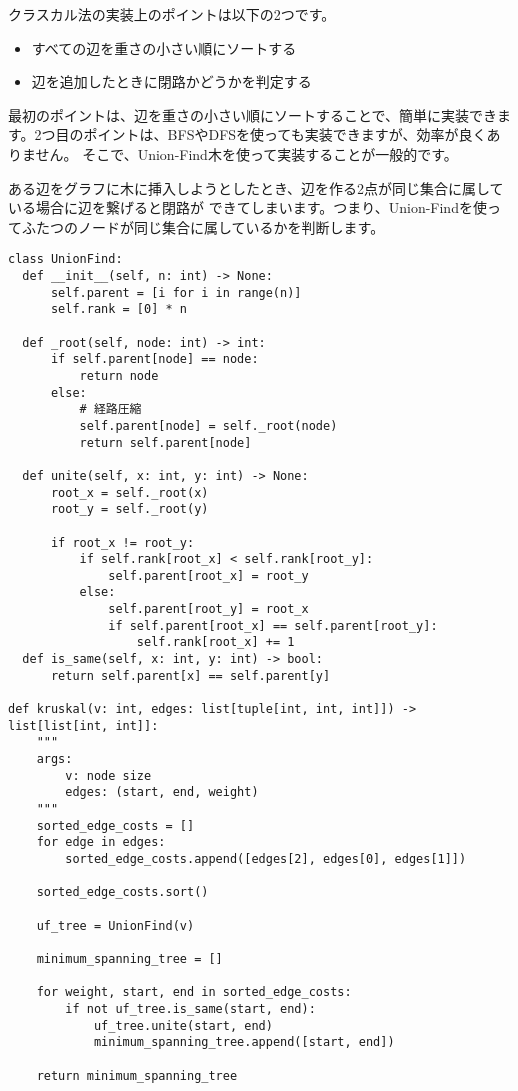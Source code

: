 \documentclass{jlreq}
\begin{document}
\vspace{0.5cm}

クラスカル法の実装上のポイントは以下の2つです。

\begin{itemize}
  \item すべての辺を重さの小さい順にソートする
  \item 辺を追加したときに閉路かどうかを判定する
\end{itemize}

最初のポイントは、辺を重さの小さい順にソートすることで、簡単に実装できます。2つ目のポイントは、BFSやDFSを使っても実装できますが、効率が良くありません。
そこで、Union-Find木を使って実装することが一般的です。

ある辺をグラフに木に挿入しようとしたとき、辺を作る2点が同じ集合に属している場合に辺を繋げると閉路が
できてしまいます。つまり、Union-Findを使ってふたつのノードが同じ集合に属しているかを判断します。

\begin{lstlisting}[caption=クラスカル法の実装, label=kruskal, frame=TRBL, label={kruskal}]
class UnionFind:
  def __init__(self, n: int) -> None:
      self.parent = [i for i in range(n)]
      self.rank = [0] * n
  
  def _root(self, node: int) -> int:
      if self.parent[node] == node:
          return node
      else:
          # 経路圧縮
          self.parent[node] = self._root(node)
          return self.parent[node]
  
  def unite(self, x: int, y: int) -> None:
      root_x = self._root(x)
      root_y = self._root(y)
      
      if root_x != root_y:
          if self.rank[root_x] < self.rank[root_y]:
              self.parent[root_x] = root_y
          else:
              self.parent[root_y] = root_x
              if self.parent[root_x] == self.parent[root_y]:
                  self.rank[root_x] += 1
  def is_same(self, x: int, y: int) -> bool:
      return self.parent[x] == self.parent[y]

def kruskal(v: int, edges: list[tuple[int, int, int]]) -> list[list[int, int]]:
    """
    args:
        v: node size
        edges: (start, end, weight)
    """
    sorted_edge_costs = []
    for edge in edges:
        sorted_edge_costs.append([edges[2], edges[0], edges[1]])
    
    sorted_edge_costs.sort()
    
    uf_tree = UnionFind(v)
    
    minimum_spanning_tree = []
    
    for weight, start, end in sorted_edge_costs:
        if not uf_tree.is_same(start, end):
            uf_tree.unite(start, end)
            minimum_spanning_tree.append([start, end])
    
    return minimum_spanning_tree
\end{lstlisting}
\end{document}
